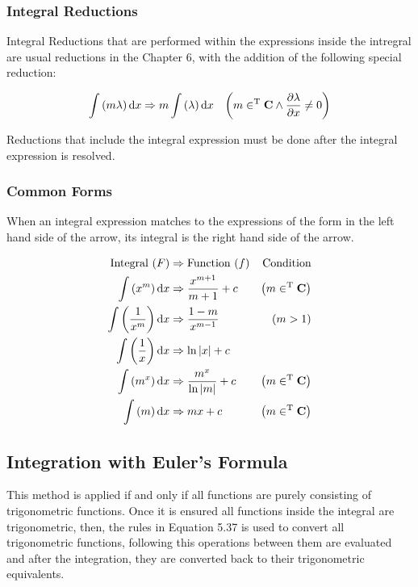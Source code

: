 \documentclass[11pt,a4paper]{book}
\begin{document}
\subsubsection{Integral Reductions}

Integral Reductions that are performed within the expressions inside the intregral are usual reductions in the Chapter 6, with the addition of the following special reduction:

\begin{align}
\int \left(m\lambda\right) \text{d}x &\Rightarrow m \int \left(\lambda\right) \text{d}x & \left(m \in^\text{T} \mathbf{C} \land \frac{\partial \lambda}{\partial x} \neq 0\right)
\end{align}

Reductions that include the integral expression must be done after the integral expression is resolved.

\subsubsection{Common Forms}

When an integral expression matches to the expressions of the form in the left hand side of the arrow, its integral is the right hand side of the arrow.

\begin{align}
\text{Integral } (F) & \Rightarrow \text{Function } (f) & \text{Condition} \\
\int \left(x^m\right) \text{d}x &\Rightarrow \frac{x^{m + 1}}{m + 1} + c & \left(m \in^\text{T} \mathbf{C}\right) \\
\int \left(\frac{1}{x^m}\right) \text{d}x &\Rightarrow \frac{1 - m}{x^{m - 1}} &\left(m > 1\right)\\
\int \left(\frac{1}{x}\right) \text{d}x &\Rightarrow \ln|x| + c\\
\int \left(m^x\right) \text{d}x &\Rightarrow \frac{m^x}{\ln|m|} + c & \left(m \in^\text{T} \mathbf{C}\right)\\
\int \left(m\right) \text{d}x &\Rightarrow mx + c &\left(m \in^\text{T} \mathbf{C}\right) 
\end{align}

\subsection{Integration with Euler's Formula}

This method is applied if and only if all functions are purely consisting of trigonometric functions. Once it is ensured all functions inside the integral are trigonometric, then, the rules in Equation 5.37 is used to convert all trigonometric functions, following this operations between them are evaluated and after the integration, they are converted back to their trigonometric equivalents.
\end{document}
